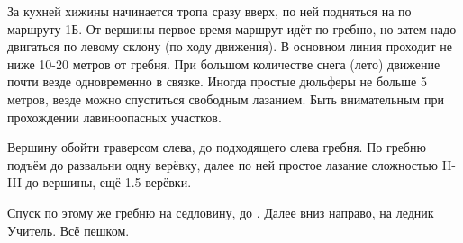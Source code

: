 За кухней хижины \geoLighthouse{} начинается тропа сразу вверх, по ней
подняться на \geoPeakUchitel{} по маршруту 1Б. От вершины первое время
маршрут идёт по гребню, но затем надо двигаться по левому склону (по
ходу движения). В основном линия проходит не ниже 10-20 метров от
гребня. При большом количестве снега (лето) движение почти везде
одновременно в связке. Иногда простые дюльферы не больше 5 метров,
везде можно спуститься свободным лазанием. Быть внимательным при
прохождении лавиноопасных участков.

Вершину \geoBaichechekey{} обойти траверсом слева, до подходящего слева
гребня. По гребню подъём до развальни одну верёвку, далее по ней
простое лазание сложностью II-III до вершины, ещё 1.5 верёвки.

Спуск по этому же гребню на седловину, до
. Далее
вниз направо, на ледник Учитель. Всё пешком.
